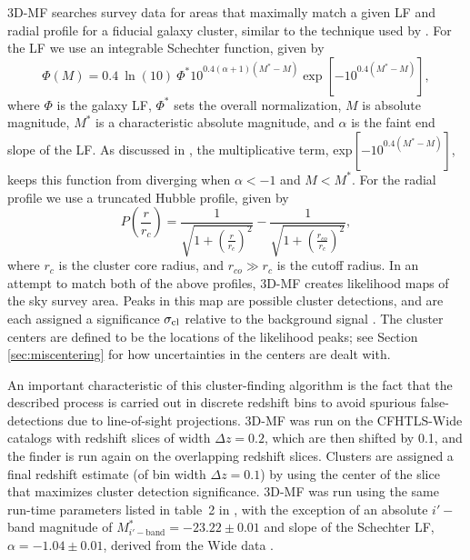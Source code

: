 \ac{3D-MF} searches survey data for areas that maximally match a given \ac{LF} and radial profile for a fiducial galaxy cluster, similar to the technique used by \citet{Postman96}.  For the \ac{LF} we use an integrable Schechter function, given by
\begin{equation}
\Phi(M)=0.4 \ \ln(10) \ \Phi^* 10^{0.4(\alpha + 1)(M^*-M)} \exp \left[ -10^{0.4(M^*-M)} \right],
\end{equation}
where $\Phi$ is the galaxy \ac{LF}, $\Phi^*$ sets the overall normalization, $M$ is absolute magnitude, $M^*$ is a characteristic absolute magnitude, and $\alpha$ is the faint end slope of the \ac{LF}. As discussed in \citet{Milkeraitis10}, the multiplicative term, exp$[-10^{0.4(M^{*}-M)}]$, keeps this function from diverging when $\alpha < -1$ and $M < M^*$. For the radial profile we use a truncated Hubble profile, given by
\begin{equation}
P \left ( \frac{r}{r_c} \right )=\frac{1}{\sqrt{1+ \left ( \frac{r}{r_c} \right ) ^2}} - \frac{1}{\sqrt{1+ \left ( \frac{r_{co}}{r_c} \right ) ^2}},
\end{equation}
where $r_c$ is the cluster core radius, and $r_{co} \gg r_c$ is the cutoff radius. In an attempt to match both of the above profiles, \ac{3D-MF} creates likelihood maps of the sky survey area. Peaks in this map are possible cluster detections, and are each assigned a significance $\sigma_{\rm cl}$ relative to the background signal \citep[$\sigma_{\rm cl}$ is calculated using Equation 5 of][which the reader is referred to for more details]{Milkeraitis10}. The cluster centers are defined to be the locations of the likelihood peaks; see Section \ref{sec:miscentering} for how uncertainties in the centers are dealt with.

An important characteristic of this cluster-finding algorithm is the fact that the described process is carried out in discrete redshift bins to avoid spurious false-detections due to line-of-sight projections. \ac{3D-MF} was run on the \ac{CFHTLS}-Wide catalogs with redshift slices of width $\Delta z = 0.2$, which are then shifted by 0.1, and the finder is run again on the overlapping redshift slices. Clusters are assigned a final redshift estimate (of bin width $\Delta z = 0.1$) by using the center of the slice that maximizes cluster detection significance. \ac{3D-MF} was run using the same run-time parameters listed in table~2 in \citet{Milkeraitis10}, with the exception of an absolute $i'-$band magnitude of $M^*_{i'-\mathrm{band}}=-23.22 \pm 0.01$ and slope of the Schechter \ac{LF}, $\alpha=-1.04 \pm 0.01$, derived from the Wide data \citep{MMthesis11}.

